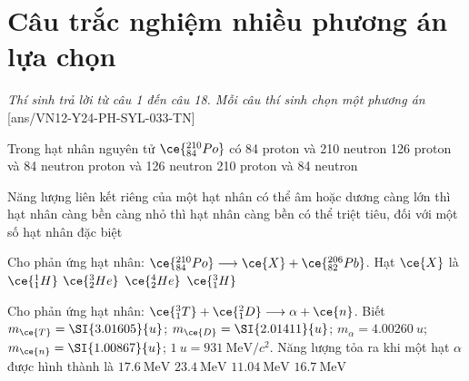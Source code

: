 \setcounter{section}{0}
\section{Câu trắc nghiệm nhiều phương án lựa chọn}
\textit{Thí sinh trả lời từ câu 1 đến câu 18. Mỗi câu thí sinh chọn một phương án}
\setcounter{ex}{0}
[ans/VN12-Y24-PH-SYL-033-TN]
\begin{ex}
	Trong hạt nhân nguyên tử $\ce{^{210}_{84}Po}$ có
	\choice
	{84 proton và 210 neutron}
	{126 proton và 84 neutron}
	{ proton và 126 neutron}
	{210 proton và 84 neutron}
	\loigiai{}
\end{ex}
\begin{ex}
	Năng lượng liên kết riêng của một hạt nhân
	\choice
	{có thể âm hoặc dương}
	{\True càng lớn thì hạt nhân càng bền}
	{càng nhỏ thì hạt nhân càng bền}
	{có thể triệt tiêu, đối với một số hạt nhân đặc biệt}
	\loigiai{}
\end{ex}
\begin{ex}
	Cho phản ứng hạt nhân: $\ce{^{210}_{84}Po}\longrightarrow\ce{X}+\ce{^{206}_{82}Pb}$. Hạt $\ce{X}$ là
	\choice
	{$\ce{^1_1H}$}
	{$\ce{^3_2He}$}
	{\True $\ce{^4_2He}$}
	{$\ce{^3_1H}$}
	\loigiai{}
\end{ex}
\begin{ex}
	Cho phản ứng hạt nhân: $\ce{^3_1T}+\ce{^2_1D}\longrightarrow\alpha+\ce{n}$. Biết $m_{\ce{T}}=\SI{3.01605}{u}$; $m_{\ce{D}}=\SI{2.01411}{u}$; $m_{\alpha}=\SI{4.00260}{u}$; $m_{\ce{n}}=\SI{1.00867}{u}$; $\SI{1}{u}=\SI{931}{\mega\electronvolt/c^2}$. Năng lượng tỏa ra khi một hạt $\alpha$ được hình thành là
	\choice
	{\True $\SI{17.6}{\mega\electronvolt}$}
	{$\SI{23.4}{\mega\electronvolt}$}
	{$\SI{11.04}{\mega\electronvolt}$}
	{$\SI{16.7}{\mega\electronvolt}$}
	\loigiai{}
\end{ex}
